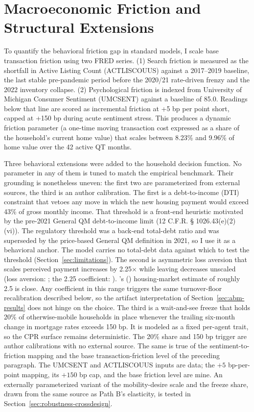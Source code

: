 \documentclass[12pt]{article}
\newcommand{\citepos}[1]{\citeauthor{#1}'s (\citeyear{#1})}
\begin{document}
\section{Macroeconomic Friction and Structural Extensions}\label{sec:method-frictions}

To quantify the behavioral friction gap in standard models, I scale base transaction friction using two FRED series. (1) Search friction is measured as the shortfall in Active Listing Count (ACTLISCOUUS) against a 2017--2019 baseline, the last stable pre-pandemic period before the 2020/21 rate-driven frenzy and the 2022 inventory collapse. (2) Psychological friction is indexed from University of Michigan Consumer Sentiment (UMCSENT) against a baseline of 85.0. Readings below that line are scored as incremental friction at +5 bp per point short, capped at +150 bp during acute sentiment stress. This produces a dynamic friction parameter (a one-time moving transaction cost expressed as a share of the household's current home value) that scales between 8.23\% and 9.96\% of home value over the 42 active QT months.

Three behavioral extensions were added to the household decision function. No parameter in any of them is tuned to match the empirical benchmark. Their grounding is nonetheless uneven: the first two are parameterized from external sources, the third is an author calibration. The first is a debt-to-income (DTI) constraint that vetoes any move in which the new housing payment would exceed 43\% of gross monthly income. That threshold is a front-end heuristic motivated by the pre-2021 General QM debt-to-income limit (12 C.F.R. \S{} 1026.43(e)(2)(vi)). The regulatory threshold was a back-end total-debt ratio and was superseded by the price-based General QM definition in 2021, so I use it as a behavioral anchor. The model carries no total-debt data against which to test the threshold (Section~\ref{sec:limitations}). The second is asymmetric loss aversion that scales perceived payment increases by 2.25$\times$ while leaving decreases unscaled (loss aversion: \citealp{kahneman1979}; the 2.25 coefficient: \citealp{tversky1992}). \citepos{andersen2022} housing-market estimate of roughly 2.5 is close. Any coefficient in this range triggers the same turnover-floor recalibration described below, so the artifact interpretation of Section~\ref{sec:abm-results} does not hinge on the choice. The third is a wait-and-see freeze that holds 20\% of otherwise-mobile households in place whenever the trailing six-month change in mortgage rates exceeds 150 bp. It is modeled as a fixed per-agent trait, so the CPR surface remains deterministic. The 20\% share and 150 bp trigger are author calibrations with no external source. The same is true of the sentiment-to-friction mapping and the base transaction-friction level of the preceding paragraph. The UMCSENT and ACTLISCOUUS inputs are data; the $+5$ bp-per-point mapping, its $+150$ bp cap, and the base friction level are mine. An externally parameterized variant of the mobility-desire scale and the freeze share, drawn from the same source as Path B's elasticity, is tested in Section~\ref{sec:robustness-crossdesign}.
\end{document}
